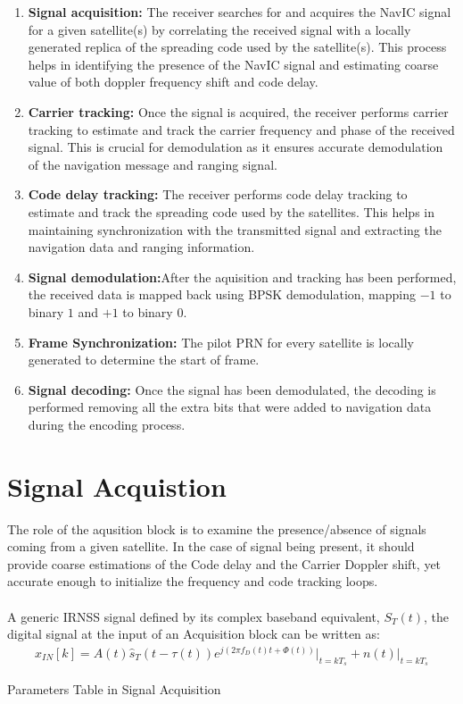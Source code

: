 \begin{enumerate}
	\item \textbf{Signal acquisition:} The receiver searches for and acquires the NavIC signal for a given satellite(s) by correlating the received signal with a locally generated replica of the spreading code used by the satellite(s). This process helps in identifying the presence of the NavIC signal and estimating coarse value of both doppler frequency shift and code delay.
\item \textbf{Carrier tracking:} Once the signal is acquired, the receiver performs carrier tracking to estimate and track the carrier frequency and phase of the received signal. This is crucial for demodulation as it ensures accurate demodulation of the navigation message and ranging signal.
\item \textbf{Code delay tracking:} The receiver performs code delay tracking to estimate and track the spreading code used by the satellites. This helps in maintaining synchronization with the transmitted signal and extracting the navigation data and ranging information.

\item \textbf{Signal demodulation:}After the aquisition and tracking has been performed, the received data is mapped back using BPSK demodulation, mapping $-1$ to binary $1$ and $+1$ to binary $0$.
\item \textbf{Frame Synchronization:} The pilot PRN for every satellite is locally generated to determine the start of frame.
\item \textbf{Signal decoding:} Once the signal has been demodulated, the decoding is performed removing all the extra bits that were added to navigation data during the encoding process.
\end{enumerate}

\section{Signal Acquistion}
The role of the aqusition block is to examine the presence/absence of signals coming from a given satellite. In the case of signal being present, it should provide coarse estimations of the Code delay and the Carrier Doppler shift, yet accurate enough to initialize the frequency and code tracking loops.
\\
\\
A generic IRNSS signal defined by its complex baseband equivalent, 
$S_T(t)$, the digital signal at the input of an Acquisition block can be written as:
\begin{align}
	x_{IN}[k]=A(t)\hat s_T (t-\tau(t))e^{j(2 \pi f_D(t)t+\Phi(t))}\bigg|_{t=kT_s} +n(t)\bigg|_{t=kT_s}
\end{align}
\begin{table}[h]

\vspace{3mm}
\caption{Parameters Table in Signal Acquisition}
\label{table:table_para}
\end{table}

